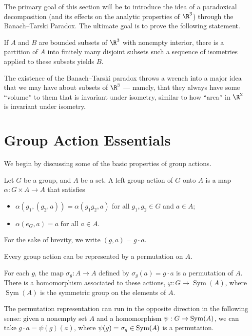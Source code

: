 The primary goal of this section will be to introduce the idea of a paradoxical decomposition (and its effects on the analytic properties of $\R^3$) through the Banach--Tarski Paradox. The ultimate goal is to prove the following statement.
\begin{proposition}
  If $A$ and $B$ are bounded subsets of $\R^3$ with nonempty interior, there is a partition of $A$ into finitely many disjoint subsets such a sequence of isometries applied to these subsets yields $B$.
\end{proposition}
The existence of the Banach--Tarski paradox throws a wrench into a major idea that we may have about subsets of $\R^3$ --- namely, that they always have some ``volume'' to them that is invariant under isometry, similar to how ``area'' in $\R^2$ is invariant under isometry.
\section{Group Action Essentials}
We begin by discussing some of the basic properties of group actions.
\begin{definition}
  Let $G$ be a group, and $A$ be a set. A left group action of $G$ onto $A$ is a map $\alpha: G\times A\rightarrow A$ that satisfies
  \begin{itemize}
    \item $\alpha\left(g_1,\left(g_2,a\right)\right) = \alpha\left(g_1g_2,a\right)$ for all $g_1,g_2\in G$ and $a\in A$;
    \item $\alpha\left(e_G,a\right) = a$ for all $a\in A$.
  \end{itemize}
  For the sake of brevity, we write $\left(g,a\right) = g\cdot a$.
\end{definition}
Every group action can be represented by a permutation on $A$.
\begin{definition}
  For each $g$, the map $\sigma_g: A\rightarrow A$ defined by $\sigma_g\left(a\right) = g\cdot a$ is a permutation of $A$. There is a homomorphism associated to these actions, $\varphi: G\rightarrow \operatorname{Sym}(A)$, where $\operatorname{Sym}(A)$ is the symmetric group on the elements of $A$.
\end{definition}
The permutation representation can run in the opposite direction in the following sense: given a nonempty set $A$ and a homomorphism $\psi: G\rightarrow \operatorname{Sym}(A)$, we can take $g\cdot a = \psi(g)(a)$, where $\psi(g) = \sigma_g\in \operatorname{Sym}(A)$ is a permutation.\newline

